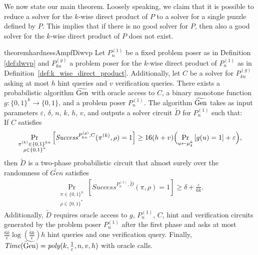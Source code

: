We now state our main theorem. Loosely speaking, we claim that it is possible to reduce a solver for the $k$-wise direct product of $P$
to a solver for a single puzzle defined by $P$. This implies that if there is no good solver for $P$, then also a good solver for
the $k$-wise direct product of $P$ does not exist.
\begin{restatable}{theorem}{hardnessAmpfDiwvp}
\label{th:sec_amp_for_dwvp}
Let $P_{n}^{(1)}$ be a fixed problem poser as in Definition \ref{def:dwvp}
and $P_{kn}^{(g)}$ a problem poser for the $k$-wise direct product of $P_{n}^{(1)}$ as in Definition~\ref{def:k_wise_direct_product}.
Additionally, let $C$ be a solver for $P_{kn}^{(g)}$ asking at most $h$ hint queries and $v$ verification queries.
There exists a probabilistic algorithm $\widetilde{\operatorname{\text{Gen}}}$ with oracle access to $C$,
a binary monotone function $g:\{0,1\}^k \rightarrow \{0,1\}$, and a problem poser $P_{n}^{(1)}$.
The algorithm $\widetilde{\operatorname{\text{Gen}}}$ takes as input parameters $\varepsilon$, $\delta$, $n$, $k$, $h$, $v$,
and outputs a solver circuit $\widetilde{D}$ for $P_{n}^{(1)}$ such that: \\
If $C$ satisfies
  \begin{align}
    \label{th_sec_amp_dwvp_assum}
    \underset{\substack{\pi^{(k)} \in \{0,1\}^{kn} \\ \rho \in \{0,1\}^{*}}}{\Pr}\left[\mathit{Success}^{P_{kn}^{(g)}, C}(\pi^{(k)}, \rho) = 1\right]
    \geq 16(h+v)\Bigl(\underset{u \leftarrow \mu_\delta^k}{\Pr}\left[g(u) = 1\right] + \varepsilon\Bigr),
  \end{align}
then $\widetilde{D}$ is a two-phase probabilistic circuit that almost surely over the randomness of $\widetilde{Gen}$ satisfies
  \begin{align}
    \underset{\substack{\pi \in \{0,1\}^{n} \\ \rho \in \{0,1\}^{*}}}
    {\Pr}\left[\mathit{Success}^{P_{n}^{(1)},\widetilde{D}}(\pi, \rho) = 1\right] \geq \delta + \frac{\varepsilon}{6k}.
  \end{align}
Additionally, $\widetilde{D}$ requires oracle access to $g$, $P_{n}^{(1)}$, $C$, hint and verification circuits generated by the problem poser $P_n^{(1)}$ after the first phase
and asks at most $\frac{6k}{\epsilon}\log\left(\frac{6k}{\epsilon}\right) h$ hint queries and one verification query.
Finally, $\mathit{Time}(\widetilde{\operatorname{\text{Gen}}}) = \operatorname{\mathit{poly}}(k, \frac{1}{\varepsilon}, n, v, h)$ with oracle calls.
\end{restatable}
%

